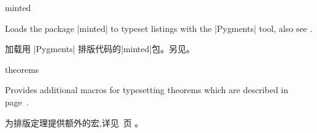 \begin{docTcbKey}[library]{minted}{}{}

Loads the package |minted| %
to typeset listings with the |Pygments| %
 tool, also see .

加载用 |Pygments| %
排版代码的|minted|包。另见。

\end{docTcbKey}

\begin{docTcbKey}[library]{theorems}{}{}

Provides additional
macros for typesetting theorems which are described in %
page~\pageref{sec:theorems}.

为排版定理提供额外的宏,详见~\pageref{sec:theorems}页%
。

\end{docTcbKey}









% 
% 

